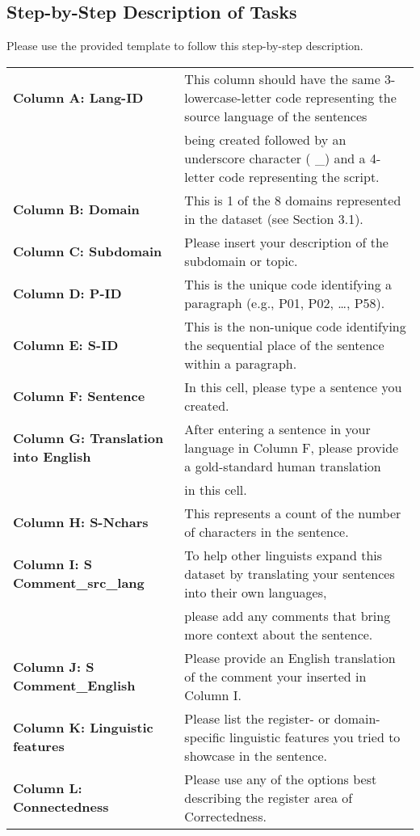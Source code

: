 \subsection{Step-by-Step Description of Tasks}
Please use the provided template to follow this step-by-step description.

\scriptsize{
\begin{tabular}{|l|l|}
\hline
\textbf{Column A: Lang-ID} & This column should have the same 3-lowercase-letter code representing the source language of the sentences \\
&being created followed by an underscore character ( \_) and a 4-letter code representing the script. \\
\hline
\textbf{Column B: Domain} & This is 1 of the 8 domains represented in the dataset (see Section 3.1). \\
\hline
\textbf{Column C: Subdomain} & Please insert your description of the subdomain or topic. \\
\hline
\textbf{Column D: P-ID} & This is the unique code identifying a paragraph (e.g., P01, P02, \ldots, P58). \\
\hline
\textbf{Column E: S-ID} & This is the non-unique code identifying the sequential place of the sentence within a paragraph. \\
\hline
\textbf{Column F: Sentence} & In this cell, please type a sentence you created. \\
\hline
\textbf{Column G: Translation into English} & After entering a sentence in your language in Column F, please provide a gold-standard human translation \\& in this cell. \\
\hline
\textbf{Column H: S-Nchars} & This represents a count of the number of characters in the sentence. \\
\hline
\textbf{Column I: S Comment\_src\_lang} & To help other linguists expand this dataset by translating your sentences into their own languages,\\& please add any comments that bring more context about the sentence. \\
\hline
\textbf{Column J: S Comment\_English} & Please provide an English translation of the comment your inserted in Column I. \\
\hline
\textbf{Column K: Linguistic features} & Please list the register- or domain-specific linguistic features you tried to showcase in the sentence. \\
\hline
\textbf{Column L: Connectedness} & Please use any of the options best describing the register area of Correctedness. \\

\end{tabular}}
